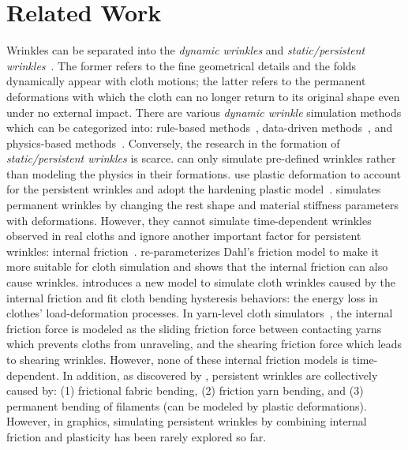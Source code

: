 \section{Related Work}
Wrinkles can be separated into the \textit{dynamic wrinkles} and \textit{static/persistent wrinkles}~\cite{larboulette2004real}. The former refers to the fine geometrical details and the folds dynamically appear with cloth motions; the latter refers to the permanent deformations with which the cloth can no longer return to its original shape even under no external impact. There are various \textit{dynamic wrinkle} simulation methods which can be categorized into: rule-based methods~\cite{hadap1999animating, cutler2005art}, data-driven methods~\cite{wang2010example, lahner2018deepwrinkles}, and physics-based methods~\cite{kunii1990modeling, bridson2005simulation, wang2021gpu}. Conversely, the research in the formation of \textit{static/persistent wrinkles} is scarce. \cite{pizana2020bending} can only simulate pre-defined wrinkles rather than modeling the physics in their formations. \cite{narain2013folding,guo2018material} use plastic deformation to account for the persistent wrinkles and adopt the hardening plastic model~\cite{gingold2004discrete}. \cite{kim2011persistent} simulates permanent wrinkles by changing the rest shape and material stiffness parameters with deformations. However, they cannot simulate time-dependent wrinkles observed in real cloths \cite{levison1962some} and ignore another important factor for persistent wrinkles: internal friction~\cite{chapman197227,brenner1964mechanical,prevorsek1975influence,chapman1975importance}. \cite{miguel2013modeling} re-parameterizes Dahl's friction model to make it more suitable for cloth simulation and shows that the internal friction can also cause wrinkles. \cite{wong2013modelling} introduces a new model to simulate cloth wrinkles caused by the internal friction and fit cloth bending hysteresis behaviors: the energy loss in clothes' load-deformation processes. In yarn-level cloth simulators~\cite{cirio2014yarn}, the internal friction force is modeled as the sliding friction force between contacting yarns which prevents cloths from unraveling, and the shearing friction force which leads to shearing wrinkles. However, none of these internal friction models is time-dependent. In addition, as discovered by \cite{prevorsek1975influence}, persistent wrinkles are collectively caused by: (1) frictional fabric bending, (2) friction yarn bending, and (3) permanent bending of filaments (can be modeled by plastic deformations). However, in graphics, simulating persistent wrinkles by combining internal friction and plasticity has been rarely explored so far.


